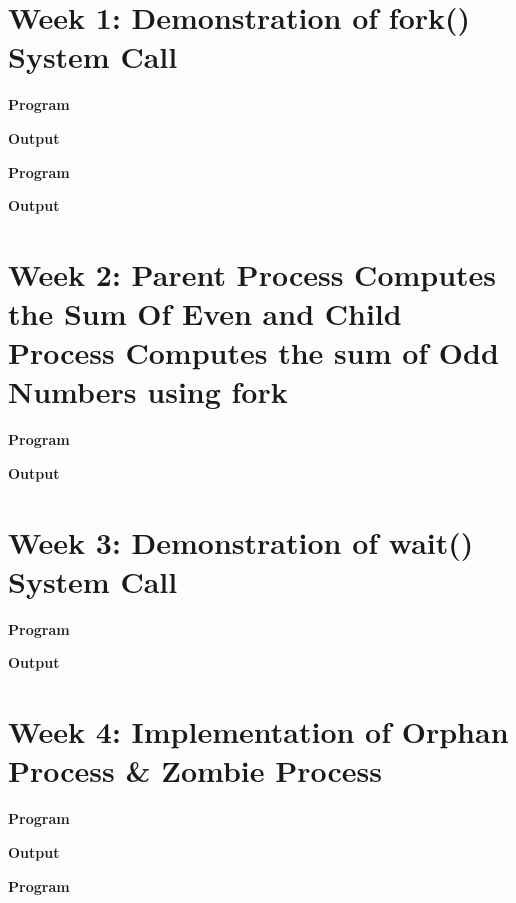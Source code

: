 \documentclass{article}
\begin{document}


\newpage

\section{Week 1: Demonstration of fork() System Call}

\noindent \textbf{\large{Program}}


\newpage
\noindent \textbf{\large{Output}}


\newpage
\noindent \textbf{\large{Program}}


\newpage
\noindent \textbf{\large{Output}}


\newpage
\section{Week 2: Parent Process Computes the Sum Of Even and Child Process Computes the sum of Odd Numbers using fork}

\noindent \textbf{\large{Program}}


\newpage
\noindent \textbf{\large{Output}}


\newpage
\section{Week 3: Demonstration of wait() System Call}

\noindent \textbf{\large{Program}}


\newpage
\noindent \textbf{\large{Output}}


\newpage
\section{Week 4: Implementation of Orphan Process \& Zombie Process}

\noindent \textbf{\large{Program}}


\newpage
\noindent \textbf{\large{Output}}


\newpage
\noindent \textbf{\large{Program}}

\end{document}
